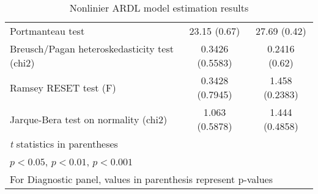 \begin{table}[ht]
\begin{tabularx}
\begin{tabular}{l*{2}{c}}
			Portmanteau test			& 23.15 (0.67) &  27.69 (0.42)\\
			Breusch/Pagan heteroskedasticity test (chi2) & 0.3426 (0.5583)  & 0.2416 (0.62)  \\
			 Ramsey RESET test (F)               &             0.3428 (0.7945)  & 1.458   (0.2383)   \\
			  Jarque-Bera test on normality (chi2)   &          1.063 (0.5878)   &  1.444  (0.4858)  \\
			\hline\hline
			\multicolumn{3}{l}{\footnotesize \textit{t} statistics in parentheses} \\
			\multicolumn{3}{l}{\footnotesize \sym{*} \(p<0.05\), \sym{**} \(p<0.01\), \sym{***} \(p<0.001\)}\\
			\multicolumn{3}{l}{\footnotesize For Diagnostic panel, values in parenthesis represent p-values} \\
		\end{tabular}

	\end{tabularx}

		
\caption{Nonlinier ARDL model estimation results}
	
\end{table}

